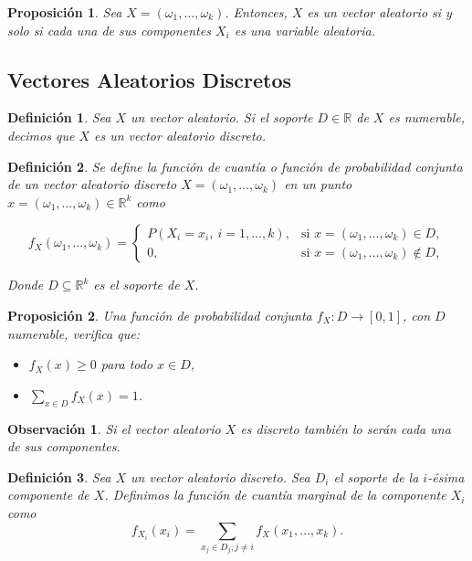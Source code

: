 \documentclass{report}
\newtheorem{prop}{Proposición}[section]
\newtheorem{dfn}{Definición}[section]
\newtheorem{obs}{Observación}[section]
\begin{document}
\begin{prop}
Sea \( X = (\omega_1, \dots, \omega_k) \). Entonces, \( X \) es un vector aleatorio si y solo si cada una de sus componentes \( X_i \) es una variable aleatoria.
\end{prop}

\subsection{Vectores Aleatorios Discretos}

\begin{dfn}
Sea $X$ un vector aleatorio. Si el soporte $D\in\mathbb{R}$ de $X$ es numerable, decimos que $X$ es un \emph{vector aleatorio discreto}.    
\end{dfn}

\begin{dfn}
Se define la \textit{función de cuantía} o \textit{función de probabilidad conjunta} de un vector aleatorio discreto 
\( X = (\omega_1, \dots, \omega_k) \) en un punto \( x = (\omega_1, \dots, \omega_k) \in \mathbb{R}^k \) como

\[
f_X(\omega_1, \dots, \omega_k) = 
\begin{cases}
P(X_i = x_i, \ i = 1, \dots, k), & \text{si } x = (\omega_1, \dots, \omega_k) \in D, \\
0, & \text{si } x = (\omega_1, \dots, \omega_k) \notin D, 
\end{cases}
\]

Donde \( D \subseteq \mathbb{R}^k \) es el soporte de \( X \).
\end{dfn}

\begin{prop}
Una función de probabilidad conjunta \( f_X \colon D \to [0,1] \), con $D$ numerable, verifica que:

\begin{itemize}
    \item \( f_X(x) \geq 0 \) para todo \( x \in D \),
    \item \( \displaystyle\sum_{x \in D} f_X(x) = 1 \).
\end{itemize}
\end{prop}

\begin{obs}
    Si el vector aleatorio $X$ es discreto también lo serán cada una de sus componentes.
\end{obs}

\begin{dfn}
    Sea $X$ un vector aleatorio discreto. Sea $D_i$ el soporte de la $i$-ésima componente de $X$. Definimos la función de cuantía marginal de la componente
    $X_i$ como
    \begin{equation*}
        f_{X_i}(x_i) = \sum_{x_j\in D_j, j\neq i} f_X(x_1,\ldots,x_k).
    \end{equation*}
\end{dfn}
\end{document}
